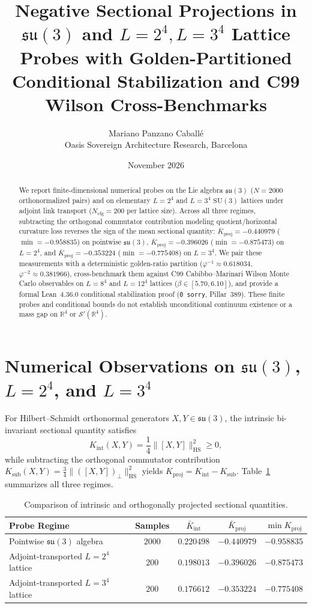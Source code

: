 \documentclass[11pt,a4paper]{article}
\title{Negative Sectional Projections in $\mathfrak{su}(3)$ and $L=2^4, L=3^4$ Lattice Probes with Golden-Partitioned Conditional Stabilization and C99 Wilson Cross-Benchmarks}
\author{Mariano Panzano Caball\'e \\ Oasis Sovereign Architecture Research, Barcelona}
\date{November 2026}
\begin{document}
\maketitle

\begin{abstract}
We report finite-dimensional numerical probes on the Lie algebra $\mathfrak{su}(3)$ ($N=2000$ orthonormalized pairs) and on elementary $L=2^4$ and $L=3^4$ $\mathrm{SU}(3)$ lattices under adjoint link transport ($N_{\mathrm{cfg}}=200$ per lattice size). Across all three regimes, subtracting the orthogonal commutator contribution modeling quotient/horizontal curvature loss reverses the sign of the mean sectional quantity: $\bar{K}_{\mathrm{proj}} = -0.440979$ ($\min = -0.958835$) on pointwise $\mathfrak{su}(3)$, $\bar{K}_{\mathrm{proj}} = -0.396026$ ($\min = -0.875473$) on $L=2^4$, and $\bar{K}_{\mathrm{proj}} = -0.353224$ ($\min = -0.775408$) on $L=3^4$. We pair these measurements with a deterministic golden-ratio partition ($\varphi^{-1} \approx 0.618034$, $\varphi^{-2} \approx 0.381966$), cross-benchmark them against C99 Cabibbo--Marinari Wilson Monte Carlo observables on $L=8^4$ and $L=12^4$ lattices ($\beta \in [5.70, 6.10]$), and provide a formal Lean~4.36.0 conditional stabilization proof (\texttt{0 sorry}, Pillar~389). These finite probes and conditional bounds do not establish unconditional continuum existence or a mass gap on $\mathbb{R}^4$ or $\mathcal{S}'(\mathbb{R}^4)$.
\end{abstract}

\section{Numerical Observations on $\mathfrak{su}(3)$, $L=2^4$, and $L=3^4$}
For Hilbert--Schmidt orthonormal generators $X, Y \in \mathfrak{su}(3)$, the intrinsic bi-invariant sectional quantity satisfies
\[
K_{\mathrm{int}}(X,Y) = \frac{1}{4}\|[X,Y]\|_{\mathrm{HS}}^2 \ge 0,
\]
while subtracting the orthogonal commutator contribution $K_{\mathrm{sub}}(X,Y) = \frac{3}{4}\|([X,Y])_\perp\|_{\mathrm{HS}}^2$ yields $K_{\mathrm{proj}} = K_{\mathrm{int}} - K_{\mathrm{sub}}$. Table~\ref{tab:probes} summarizes all three regimes.

\begin{table}[h]
\centering
\begin{tabular}{lcccc}
\hline
Probe Regime & Samples & $\bar{K}_{\mathrm{int}}$ & $\bar{K}_{\mathrm{proj}}$ & $\min K_{\mathrm{proj}}$ \\
\hline
Pointwise $\mathfrak{su}(3)$ algebra & $2000$ & $0.220498$ & $-0.440979$ & $-0.958835$ \\
Adjoint-transported $L=2^4$ lattice & $200$ & $0.198013$ & $-0.396026$ & $-0.875473$ \\
Adjoint-transported $L=3^4$ lattice & $200$ & $0.176612$ & $-0.353224$ & $-0.775408$ \\
\hline
\end{tabular}
\caption{Comparison of intrinsic and orthogonally projected sectional quantities.}
\label{tab:probes}
\end{table}
\end{document}
